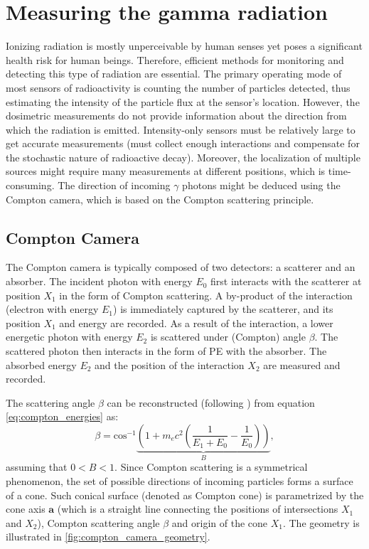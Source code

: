 \section{Measuring the gamma radiation}
Ionizing radiation is mostly unperceivable by human senses yet poses a significant health risk for human beings. 
Therefore, efficient methods for monitoring and detecting this type of radiation are essential. 
The primary operating mode of most sensors of radioactivity is counting the number of particles detected,
thus estimating the intensity of the particle flux at the sensor's location. 
However, the dosimetric measurements do not provide information about the direction from which the radiation is emitted. 
Intensity-only sensors must be relatively large to get accurate measurements (must collect enough interactions and compensate for the stochastic nature of radioactive decay).
Moreover, the localization of multiple sources might require many measurements at different positions, which is time-consuming. 
The direction of incoming $\gamma$ photons might be deduced using
the Compton camera, which is based on the Compton scattering principle.

\subsection{Compton Camera}%
The Compton camera is typically composed of two detectors: a scatterer and an absorber.
The incident photon with energy $E_{0}$ first interacts with the scatterer at position $X_{1}$ in the form of Compton scattering.
A by-product of the interaction (electron with energy $E_{1}$) is immediately captured by the scatterer, and its position $X_{1}$ and energy are recorded.
As a result of the interaction, a lower energetic photon with energy $E_{2}$ is scattered under (Compton) angle $\beta$.
The scattered photon then interacts in the form of \ac{PE} with the absorber.
The absorbed energy $E_{2}$ and the position of the interaction $X_{2}$ are measured and recorded.

The scattering angle $\beta$ can be reconstructed (following \cite{baca2021gamma}) from equation \autoref{eq:compton_energies} as:
\begin{equation}
  \beta = \mathrm{cos}^{-1} 
  \underset{B}{\underbrace{\left (
   1+m_{e}c^{2} \left( \frac{1}{E_{1}+E_{0}} - \frac{1}{E_{0}}\right )  \right )
  }},
    \label{eq:compton_beta_formula}
\end{equation}
assuming that $0<B<1$.
Since Compton scattering is a symmetrical phenomenon,  the set of possible directions of incoming particles forms a surface of a cone.
Such conical surface (denoted as Compton cone) is parametrized by the cone axis $\mathbf{a}$ (which is a straight line connecting the positions of intersections $X_{1}$ and $X_{2}$), Compton scattering angle $\beta$ and origin of the cone $X_{1}$.
The geometry is illustrated in \autoref{fig:compton_camera_geometry}.

